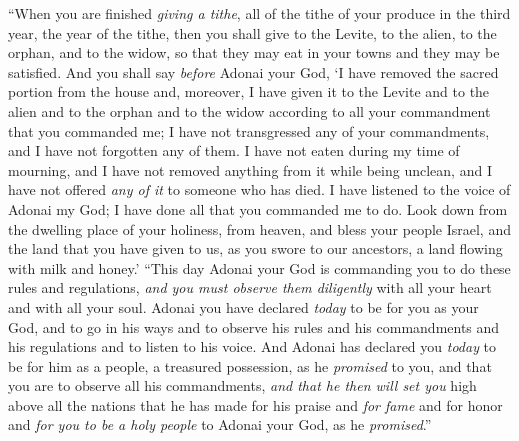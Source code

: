 \begin{biblechapter}
\verse “When you are finished \textit{giving a tithe}, all of the tithe of your produce in the third year, the year of the tithe, then you shall give to the Levite, to the alien, to the orphan, and to the widow, so that they may eat in your towns and they may be satisfied.
\verse And you shall say \textit{before} Adonai your God, ‘I have removed the sacred portion from the house and, moreover, I have given it to the Levite and to the alien and to the orphan and to the widow according to all your commandment that you commanded me; I have not transgressed any of your commandments, and I have not forgotten any of them.
\verse I have not eaten during my time of mourning, and I have not removed anything from it while being unclean, and I have not offered \textit{any of it} to someone who has died. I have listened to the voice of Adonai my God; I have done all that you commanded me to do.
\verse Look down from the dwelling place of your holiness, from heaven, and bless your people Israel, and the land that you have given to us, as you swore to our ancestors, a land flowing with milk and honey.’
\verse “This day Adonai your God is commanding you to do these rules and regulations, \textit{and you must observe them diligently} with all your heart and with all your soul.
\verse Adonai you have declared \textit{today} to be for you as your God, and to go in his ways and to observe his rules and his commandments and his regulations and to listen to his voice.
\verse And Adonai has declared you \textit{today} to be for him as a people, a treasured possession, as he \textit{promised} to you, and that you are to observe all his commandments,
\verse \textit{and that he then will set you} high above all the nations that he has made for his praise and \textit{for fame} and for honor and \textit{for you to be a holy people} to Adonai your God, as he \textit{promised}.”
\end{biblechapter}

